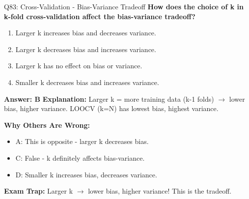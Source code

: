 \documentclass[8pt]{beamer}
\begin{document}
	\begin{frame}{Q83: Cross-Validation - Bias-Variance Tradeoff}
		\fontsize{6.5}{7.5}\selectfont
		\textbf{How does the choice of k in k-fold cross-validation affect the bias-variance tradeoff?}
		
		\begin{enumerate}
			\item Larger k increases bias and decreases variance.
			\item Larger k decreases bias and increases variance.
			\item Larger k has no effect on bias or variance.
			\item Smaller k decreases bias and increases variance.
		\end{enumerate}
		
		\vspace{0.05cm}
		\textcolor{myblue}{\textbf{Answer: B}}
		\vspace{0.05cm}
		\textcolor{myblue}{\textbf{Explanation:}} Larger k = more training data (k-1 folds) $\to$ lower bias, higher variance. LOOCV (k=N) has lowest bias, highest variance.
		
		\vspace{0.05cm}
		\textcolor{myred}{\textbf{Why Others Are Wrong:}}
		\begin{itemize}
			\item \textcolor{myred}{A:} This is opposite - larger k decreases bias.
			\item \textcolor{myred}{C:} False - k definitely affects bias-variance.
			\item \textcolor{myred}{D:} Smaller k increases bias, decreases variance.
		\end{itemize}
		
		\textcolor{myred}{\textbf{Exam Trap:}} Larger k $\rightarrow$ \textcolor{myblue}{lower bias, higher variance}! This is the tradeoff.
	\end{frame}
	
\end{document}
